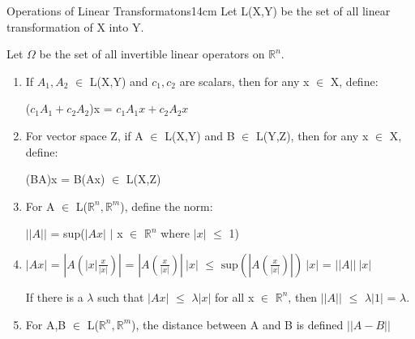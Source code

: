     \begin{definition}{Operations of Linear Transformatons}{14cm}
        Let L(X,Y) be the set of all linear transformation
        of X into Y.

        Let $\Omega$ be the set of all invertible linear operators
        on $\mathbb{R}^n$.

        \begin{enumerate}[label=(\alph*), leftmargin=0.2cm, itemsep=0.1cm]
            \item If $A_1,A_2$ $\in$ L(X,Y) and $c_1,c_2$ are scalars,
                then for any x $\in$ X, define:

                \hspace{0.5cm}
                ($c_1A_1 + c_2A_2$)x = $c_1A_1x + c_2A_2x$

            \item For vector space Z, if A $\in$ L(X,Y) and B $\in$ L(Y,Z),
                then for any x $\in$ X, define:

                \hspace{0.5cm}
                (BA)x = B(Ax) $\in$ L(X,Z)

            \item For A $\in$ L($\mathbb{R}^n,\mathbb{R}^m$),
                define the norm:
                
                \hspace{0.5cm}
                $||A||$ = sup($|Ax|$ {\color{lblue} $|$}
                                x $\in$ $\mathbb{R}^n$ where $|x|$ $\leq$ 1)

            \item $|Ax|$
                = $|A(|x|\frac{x}{|x|})|$
                = $|A(\frac{x}{|x|})| \ |x|$
                $\leq$ $\text{sup}(|A(\frac{x}{|x|})|) \ |x|$
                = $||A|| \ |x|$

                If there is a $\lambda$ such that $|Ax|$ $\leq$ $\lambda|x|$
                for all x $\in$ $\mathbb{R}^n$, then
                $||A||$ $\leq$ $\lambda|1|$ = $\lambda$.

            \item For A,B $\in$ L($\mathbb{R}^n,\mathbb{R}^m$),
                the distance between A and B is defined $||A-B||$
        \end{enumerate}
    \end{definition}

    \vspace{0.5cm}



